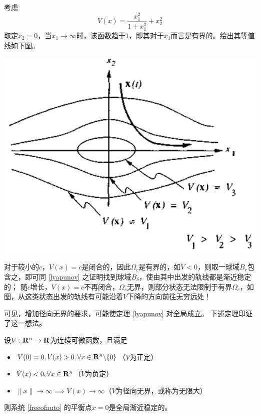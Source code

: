 \begin{example}[径向有界]
  考虑\[V(x)=\frac{x_1^2}{1+x_1^2}+x_2^2\]
  取定$x_2=0$，当$x_1\to\infty$时，该函数趋于$1$，即其对于$x_1$而言是有界的。绘出其等值线如下图。
\begin{center}
  \includegraphics[scale=0.5]{figure/nonlinear/descent_but_unstable.png}
\end{center}
  对于较小的$c$，$V(x)=c$是闭合的，因此$\Omega_c$是有界的，如$\dot{V}<0$，则取一球域$B_r$包含之，即可同 \ref{lyapunov} 之证明找到球域$B_\delta$，使由其中出发的轨线都是渐近稳定的；
  随$c$增长，$V(x)=c$不再闭合，$\Omega_c$无界，则部分状态无法限制于有界$\Omega_c$，如图，从这类状态出发的轨线有可能沿着$V$下降的方向前往无穷远处！
\end{example}
可见，增加径向无界的要求，可能使定理 \ref{lyapunov} 对全局成立。
下述定理印证了这一想法。
\begin{theorem}[全局渐近稳定定理]
  设$V:\mathbf{R}{}^n\to\mathbf{R}$为连续可微函数，且满足
    \begin{itemize}[leftmargin=1em]
      \item $V(0)=0,V(x)>0,\forall x\in \mathbf{R}{}^n\backslash\{0\}$（$V$为正定）
      \item $\dot{V}(x)< 0,\forall x\in \mathbf{R}{}^n$（$\dot{V}$为负定）
      \item $\|x\|\to\infty\implies V(x)\to \infty$（$V$为径向无界，或称为无限大）
    \end{itemize}
  则系统 \eqref{freeofauto} 的平衡点$x=0$是全局渐近稳定的。
\end{theorem}
